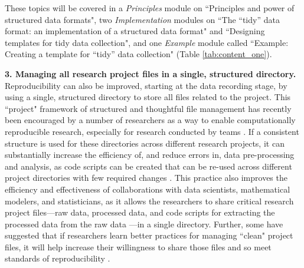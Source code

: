 \documentclass[pdftex,english,11.5pt,parskip=half]{scrartcl}
\begin{document}
These topics will
be covered in a \textit{Principles} module on ``Principles and power of
structured data formats", two \textit{Implementation} modules on ``The ``tidy''
data format: an implementation of a structured data format" and ``Designing
templates for tidy data collection", and one \textit{Example} module called
``Example: Creating a template for ``tidy'' data collection" (Table \ref*{tab:content_one}). 

\textbf{3. Managing all research project files in a single, structured directory.}
Reproducibility can also be improved, starting at the data recording stage, by using a single, structured directory to store all files related to the
project. This ``project" framework of structured and thoughtful file management has recently been encouraged by a number of
researchers as a way to enable computationally reproducible research, especially
for research conducted by teams \cite{marwick2018packaging,
parker2017opinionated, lowndes2017our}. If a consistent structure is used for these directories across different research projects, it can substantially increase the efficiency of, and reduce errors in, data pre-processing and analysis, as code scripts can be created that can be re-used across different project directories with few required changes \cite{marwick2018packaging}. This practice also improves the efficiency and effectiveness of collaborations with data scientists, mathematical modelers, and statisticians, as it allows the researchers to share critical research project files---raw data, processed data, and code scripts for extracting the processed data from the raw data \cite{ellis2018share, shade2015computing}---in a single directory. Further, some have suggested that if researchers learn better practices for managing ``clean" project files, it will help increase their willingness to share those files and so meet standards of reproducibility \cite{marwick2018packaging}. 
\end{document}
